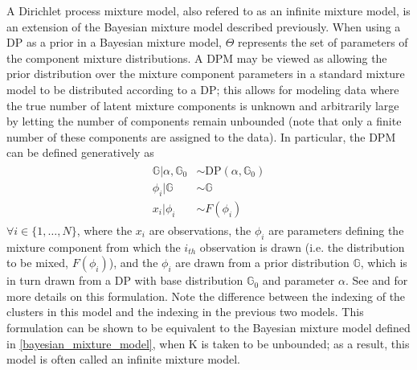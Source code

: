 \documentclass[smallcondensed, final]{svjour3}
\begin{document}
A Dirichlet process mixture model, also refered to as an infinite mixture model, is an extension of the Bayesian mixture model described previously. 
When using a DP as a prior in a Bayesian mixture model, $\Theta$ represents the set of parameters of the component mixture distributions. A DPM may be viewed as allowing the prior distribution over the mixture component parameters in a standard mixture model to be distributed according to a DP; this allows for modeling data where the true number of latent mixture components is unknown and arbitrarily large by letting the number of components remain unbounded (note that only a finite number of these components are assigned to the data). In particular, the DPM can be defined generatively as
\begin{align}
\begin{split}
	\mathbb{G} | \alpha, \mathbb{G}_{0}  &\sim  \text{DP}(\alpha, \mathbb{G}_{0}) \\
	\phi_{i} | \mathbb{G}  &\sim  \mathbb{G} \\
	x_{i}|\phi_{i} &\sim F(\phi_{i})
\end{split}
\end{align}
$\forall i \in \{ 1, \ldots, N \}$, where the $x_{i}$ are observations, the $\phi_{i}$ are parameters defining the mixture component from which the $i_{th}$ observation is drawn (i.e. the distribution to be mixed, $F(\phi_{i})$), and the $\phi_{i}$ are drawn from a prior distribution $\mathbb{G}$, which is in turn drawn from a DP with base distribution $\mathbb{G}_{0}$ and parameter $\alpha$. See \cite{gasthaus_2008} and \cite{gasthaus_thesis} for more details on this formulation. Note the difference between the indexing of the clusters in this model and the indexing in the previous two models. This formulation can be shown to be equivalent to the Bayesian mixture model defined in \eqref{bayesian_mixture_model}, when K is taken to be unbounded; as a result, this model is often called an infinite mixture model.
\end{document}
